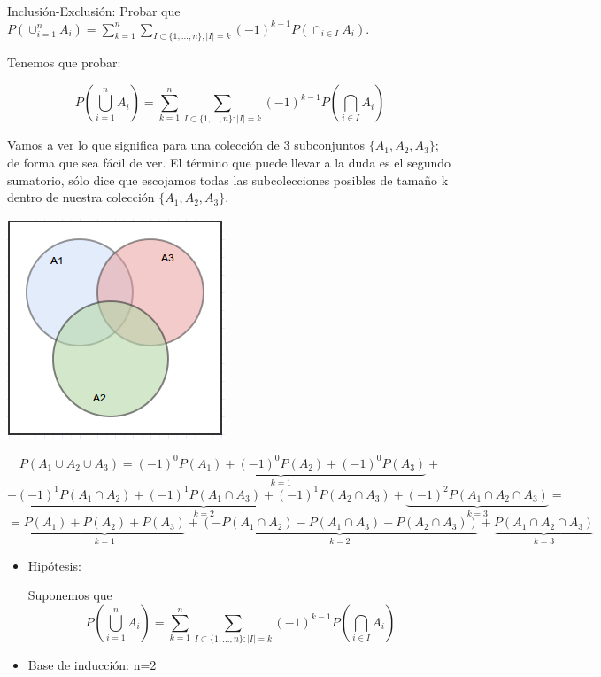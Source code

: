 \begin{problem}[10]Inclusi\'on-Exclusi\'on: Probar que 
$
P(\cup_{i=1}^n A_i)= \sum_{k=1}^n \sum_{I\subset \{1, \dots, n\}, |I| = k} (-1)^{k-1}
P(\cap_{i\in I} A_i).
$
\solution

\begin{expla}

Tenemos que probar:

\[
P(\bigcup_{i=1}^nA_i)=\sum_{k=1}^{n}\sum_{I\subset \{1,...,n\}:|I|=k}(-1)^{k-1}P(\bigcap_{i\in I}A_i)
\]

Vamos a ver lo que significa para una colección de 3 subconjuntos $\{A_1,A_2,A_3\}$; de forma que sea fácil de ver. El término que puede llevar a la duda es el segundo sumatorio, sólo dice que escojamos todas las subcolecciones posibles de tamaño k dentro de nuestra colección $\{A_1,A_2,A_3\}$.

\begin{center}
\includegraphics[scale=0.75]{img/Dvenn4.png}
\end{center}

\[
P(A_1\cup A_2 \cup A_3)=\underbrace{(-1)^0P(A_1)+(-1)^0P(A_2)+(-1)^0P(A_3)}_{k=1}+
\]
\[
+\underbrace{(-1)^1P(A_1\cap A_2)+(-1)^1P(A_1\cap A_3)+(-1)^1P(A_2\cap A_3)}_{k=2}+\underbrace{(-1)^2P(A_1\cap A_2\cap A_3)}_{k=3}=
\]
\[
=\underbrace{P(A_1)+P(A_2)+P(A_3)}_{k=1}+\underbrace{(-P(A_1\cap A_2)-P(A_1\cap A_3)-P(A_2\cap A_3))}_{k=2}+\underbrace{P(A_1\cap A_2\cap A_3)}_{k=3}
\]

\end{expla}

\begin{itemize}
        \item Hipótesis:

        Suponemos que \[
        P(\bigcup_{i=1}^nA_i)=\sum_{k=1}^{n}\sum_{I\subset
\{1,...,n\}:|I|=k}(-1)^{k-1}P(\bigcap_{i\in I}A_i)
        \]
        \item Base de inducción: n=2


\end{itemize}
\end{problem}
